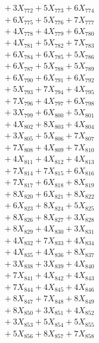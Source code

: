 \documentclass[a4paper,10pt]{article}
\begin{document}
{\begin{align}
&\;  + 3 X_{772} + 5 X_{773} + 6 X_{774} \\[0.3ex]
&\;  + 6 X_{775} + 5 X_{776} + 7 X_{777} \\[0.3ex]
&\;  + 4 X_{778} + 4 X_{779} + 6 X_{780} \\[0.3ex]
&\;  + 4 X_{781} + 5 X_{782} + 7 X_{783} \\[0.3ex]
&\;  + 6 X_{784} + 6 X_{785} + 5 X_{786} \\[0.3ex]
&\;  + 6 X_{787} + 5 X_{788} + 5 X_{789} \\[0.5ex]\allowbreak
&\;  + 6 X_{790} + 6 X_{791} + 6 X_{792} \\[0.3ex]
&\;  + 5 X_{793} + 7 X_{794} + 4 X_{795} \\[0.3ex]
&\;  + 7 X_{796} + 4 X_{797} + 6 X_{798} \\[0.3ex]
&\;  + 3 X_{799} + 6 X_{800} + 5 X_{801} \\[0.3ex]
&\;  + 4 X_{802} + 8 X_{803} + 4 X_{804} \\[0.3ex]
&\;  + 3 X_{805} + 5 X_{806} + 7 X_{807} \\[0.3ex]
&\;  + 7 X_{808} + 4 X_{809} + 7 X_{810} \\[0.3ex]
&\;  + 4 X_{811} + 4 X_{812} + 4 X_{813} \\[0.3ex]
&\;  + 7 X_{814} + 7 X_{815} + 6 X_{816} \\[0.3ex]
&\;  + 7 X_{817} + 6 X_{818} + 8 X_{819} \\[0.5ex]\allowbreak
&\;  + 8 X_{820} + 6 X_{821} + 8 X_{822} \\[0.3ex]
&\;  + 6 X_{823} + 8 X_{824} + 5 X_{825} \\[0.3ex]
&\;  + 8 X_{826} + 8 X_{827} + 3 X_{828} \\[0.3ex]
&\;  + 8 X_{829} + 4 X_{830} + 3 X_{831} \\[0.3ex]
&\;  + 4 X_{832} + 7 X_{833} + 4 X_{834} \\[0.3ex]
&\;  + 4 X_{835} + 4 X_{836} + 8 X_{837} \\[0.3ex]
&\;  + 3 X_{838} + 3 X_{839} + 4 X_{840} \\[0.3ex]
&\;  + 7 X_{841} + 4 X_{842} + 4 X_{843} \\[0.3ex]
&\;  + 7 X_{844} + 4 X_{845} + 4 X_{846} \\[0.3ex]
&\;  + 8 X_{847} + 7 X_{848} + 8 X_{849} \\[0.5ex]\allowbreak
&\;  + 8 X_{850} + 3 X_{851} + 4 X_{852} \\[0.3ex]
&\;  + 3 X_{853} + 5 X_{854} + 5 X_{855} \\[0.3ex]
&\;  + 5 X_{856} + 8 X_{857} + 7 X_{858} \\[0.3ex]

\end{align}}
\end{document}
